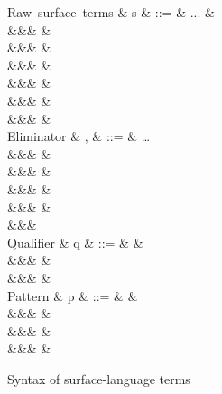 \begin{figure}[H]
\begin{syntaxfig}
\mbox{Raw surface terms}
&
s
&
::=
&
...
&
\\
&&&
&
\\
&&&
&
\\
&&&
\sExNil
&
\\
&&&
&
\\
&&&
&
\\
&&&
&
\\[2mm]

\mbox{Eliminator}
&
\sigma, \tau
&
::=
&
\ldots
\\
&&&
\elimBoolTrue{\kappa}
&
\\
&&&
\elimBoolFalse{\kappa}
&
\\
&&&
\elimListSingleton{\branchNil{\kappa}}
&
\\
&&&
\elimListSingleton{\branchCons{\sigma}}
&
\\
&&&
\\[2mm]

\mbox{Qualifier}
&
q
&
::=
&
&
\\
&&&
&
\\
&&&
&
\\[2mm]


\mbox{Pattern}
&
p
&
::=
&
&
\\
&&&
\pattNil
&
\\
&&&
&
\\
&&&
&
\\[2mm]
\end{syntaxfig}
\caption{Syntax of surface-language terms}
\end{figure}
